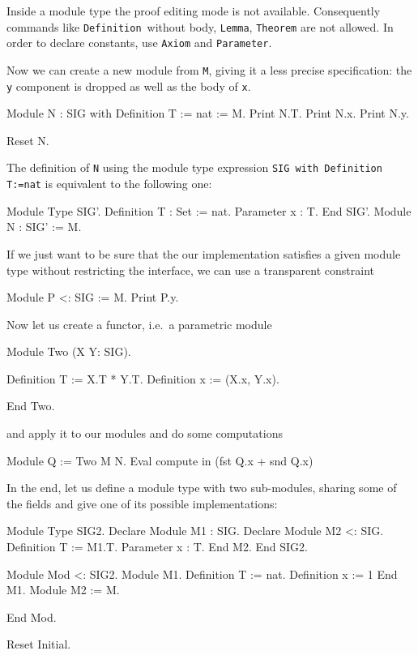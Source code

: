 \noindent
Inside a module type the proof editing mode is not available.
Consequently commands like \texttt{Definition}\ without body,
\texttt{Lemma}, \texttt{Theorem} are not allowed.  In order to declare
constants, use \texttt{Axiom} and \texttt{Parameter}.

Now we can create a new module from \texttt{M}, giving it a less
precise specification: the \texttt{y} component is dropped as well
as the body of \texttt{x}.

\begin{coq_example}
Module N : SIG with Definition T := nat := M.
Print N.T.
Print N.x.
Print N.y.
\end{coq_example}
\begin{coq_eval}
Reset N.
\end{coq_eval}

\noindent
The definition of \texttt{N} using the module type expression
\texttt{SIG with Definition T:=nat} is equivalent to the following
one:

\begin{coq_example*}
Module Type SIG'.
Definition T : Set := nat.
Parameter x : T.
End SIG'.
Module N : SIG' := M.
\end{coq_example*}
If we just want to be sure that the our implementation satisfies a
given module type without restricting the interface, we can use a
transparent constraint
\begin{coq_example}
Module P <: SIG := M.
Print P.y.
\end{coq_example}
Now let us create a functor, i.e.\ a parametric module
\begin{coq_example}
Module Two (X Y: SIG).
\end{coq_example}
\begin{coq_example*}
Definition T := X.T * Y.T.
Definition x := (X.x, Y.x).
\end{coq_example*}
\begin{coq_example}
End Two.
\end{coq_example}
and apply it to our modules and do some computations
\begin{coq_example}
Module Q := Two M N.
Eval compute in (fst Q.x + snd Q.x)%
\end{coq_example}
In the end, let us define a module type with two sub-modules, sharing
some of the fields and give one of its possible implementations:
\begin{coq_example}
Module Type SIG2.
Declare Module M1 : SIG.
Declare Module M2 <: SIG.
Definition T := M1.T.
Parameter x : T.
End M2.
End SIG2.
\end{coq_example}
\begin{coq_example*}
Module Mod <: SIG2.
Module M1.
Definition T := nat.
Definition x := 1%
End M1.
Module M2 := M.
\end{coq_example*}
\begin{coq_example}
End Mod.
\end{coq_example}
\begin{coq_eval}
Reset Initial.
\end{coq_eval}

